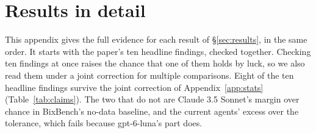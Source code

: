 \documentclass{article}
\begin{document}
\FloatBarrier
\section{Results in detail}
\label{app:results}

This appendix gives the full evidence for each result of \S\ref{sec:results}, in the same order. It starts with the
paper's ten headline findings, checked together. Checking ten findings at once raises the chance that one of them holds
by luck, so we also read them under a joint correction for multiple comparisons. Eight of the ten headline findings
survive the joint correction of Appendix~\ref{app:stats} (Table~\ref{tab:claims}). The two that do not are Claude 3.5
Sonnet's margin over chance in BixBench's no-data baseline, and the current agents' excess over the tolerance, which
fails because gpt-6-luna's part does.
\end{document}
